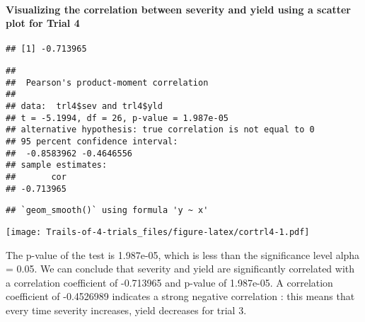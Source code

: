 \documentclass[
]{article}
\begin{document}
\hypertarget{visualizing-the-correlation-between-severity-and-yield-using-a-scatter-plot-for-trial-4}{%
\paragraph{Visualizing the correlation between severity and yield using
a scatter plot for Trial
4}\label{visualizing-the-correlation-between-severity-and-yield-using-a-scatter-plot-for-trial-4}}

\begin{verbatim}
## [1] -0.713965
\end{verbatim}

\begin{verbatim}
## 
##  Pearson's product-moment correlation
## 
## data:  trl4$sev and trl4$yld
## t = -5.1994, df = 26, p-value = 1.987e-05
## alternative hypothesis: true correlation is not equal to 0
## 95 percent confidence interval:
##  -0.8583962 -0.4646556
## sample estimates:
##       cor 
## -0.713965
\end{verbatim}

\begin{verbatim}
## `geom_smooth()` using formula 'y ~ x'
\end{verbatim}

\texttt{[image: Trails-of-4-trials\_files/figure-latex/cortrl4-1.pdf]}

The p-value of the test is 1.987e-05, which is less than the
significance level alpha = 0.05. We can conclude that severity and yield
are significantly correlated with a correlation coefficient of -0.713965
and p-value of 1.987e-05. A correlation coefficient of -0.4526989
indicates a strong negative correlation : this means that every time
severity increases, yield decreases for trial 3.
\end{document}
